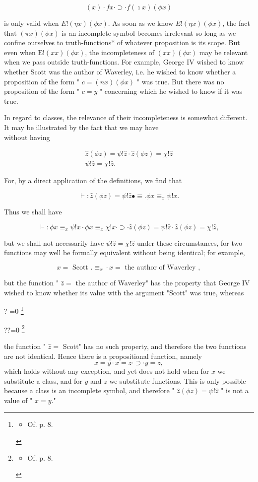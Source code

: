 \documentclass[10pt]{article}
\let\svthefootnote\thefootnote
\newcommand\blfootnotetext[1]{%
  \let\thefootnote\relax\footnote{#1}%
  \addtocounter{footnote}{-1}%
  \let\thefootnote\svthefootnote%
}
\let\svfootnotetext\footnotetext
\renewcommand\footnotetext[2][?]{%
  \if\relax#1\relax%
    \ifnum\value{footnote}=0\blfootnotetext{#2}\else\svfootnotetext{#2}\fi%
  \else%
    \if?#1\ifnum\value{footnote}=0\blfootnotetext{#2}\else\svfootnotetext{#2}\fi%
    \else\svfootnotetext[#1]{#2}\fi%
  \fi
}
\begin{document}
$$
(x) \cdot f x \cdot \supset \cdot f(\imath x)(\phi x)
$$

is only valid when $E!(\eta x)(\phi x)$. As soon as we know $E!(\eta x)(\phi x)$, the fact that $(\pi x)(\phi x)$ is an incomplete symbol becomes irrelevant so long as we confine ourselves to truth-functions* of whatever proposition is its scope. But even when $\mathrm{E}!(x x)(\phi x)$, the incompleteness of $(x x)(\phi x)$ may be relevant when we pass outside truth-functions. For example, George IV wished to know whether Scott was the author of Waverley, i.e. he wished to know whether a proposition of the form " $c=(n x)(\phi x)$ " was true. But there was no proposition of the form " $c=y$ " concerning which he wished to know if it was true.

In regard to classes, the relevance of their incompleteness is somewhat different. It may be illustrated by the fact that we may have\\
without having

$$
\begin{gathered}
\hat{z}(\phi z)=\psi!\hat{z} \cdot \hat{z}(\phi z)=\chi!\hat{z} \\
\psi!\hat{z}=\chi!\hat{z} .
\end{gathered}
$$

For, by a direct application of the definitions, we find that

$$
\vdash: \hat{z}(\phi z)=\psi!\hat{z} \bullet \equiv . \phi x \equiv_{x} \psi!x .
$$

Thus we shall have

$$
\vdash: \phi x \equiv_{x} \psi!x \cdot \phi x \equiv_{x} \chi!x \cdot \supset \cdot \hat{z}(\phi z)=\psi!\hat{z} \cdot \hat{z}(\phi z)=\chi!\hat{z},
$$

but we shall not necessarily have $\psi!\hat{z}=\chi!\hat{z}$ under these circumstances, for two functions may well be formally equivalent without being identical; for example,

$$
x=\text { Scott } . \equiv_{x} \cdot x=\text { the author of Waverley },
$$

but the function " $\hat{z}=$ the author of Waverley" has the property that George IV wished to know whether its value with the argument "Scott" was true, whereas

the function " $\hat{z}=$ Scott" has no such property, and therefore the two functions are not identical. Hence there is a propositional function, namely
$$
x=y \cdot x=z \cdot \supset \cdot y=z,
$$
which holds without any exception, and yet does not hold when for $x$ we substitute a class, and for $y$ and $z$ we substitute functions. This is only possible because a class is an incomplete symbol, and therefore " $\hat{z}(\phi z)=\psi!\hat{z}$ " is not a value of " $x=y$."
\end{document}

